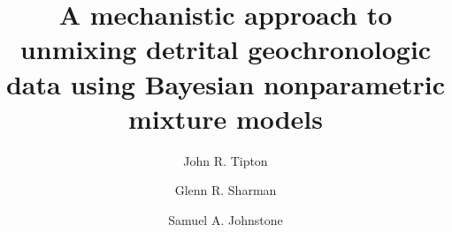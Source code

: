 \documentclass[]{elsarticle} %
\begin{document}
\begin{frontmatter}

\title{A mechanistic approach to unmixing detrital geochronologic data using Bayesian nonparametric mixture models}

\author[a]{John R. Tipton%
}
\fnmark[1]
\address[a]{University of Arkansas, Department of Mathematical Sciences, Fayetteville, AR, USA}
  
\author[a]{Glenn R. Sharman
\fnmark[2]
}


\author[b]{Samuel A. Johnstone 
\fnmark[fn3]
}

\address[b]{U.S. Geological Survey, Geosciences and Environmental Change Science Center, Denver, USA}



\end{frontmatter}
\end{document}
